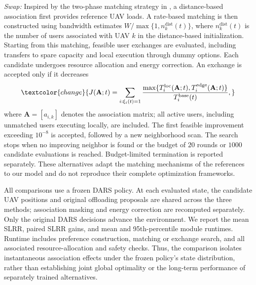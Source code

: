 \textcolor{change}{
\emph{Swap:} Inspired by the two-phase matching strategy in
\cite{wang2025matching}, a distance-based association first provides
reference UAV loads. A rate-based matching is then constructed using
bandwidth estimates $W/\max\{1,n_k^{\mathrm{dist}}(t)\}$, where
$n_k^{\mathrm{dist}}(t)$ is the number of users associated with UAV $k$
in the distance-based initialization. Starting from this matching,
feasible user exchanges are evaluated, including transfers to spare
capacity and local execution through dummy options. Each candidate
undergoes resource allocation and energy correction. An exchange is
accepted only if it decreases
}
\begin{equation}
\textcolor{change}{
 J(\mathbf A;t)=\sum_{i:\xi_i(t)=1}
 \frac{\max\{T_i^{\mathrm{loc}}(\mathbf A;t),
             T_i^{\mathrm{edge}}(\mathbf A;t)\}}
      {T_i^{\mathrm{base}}(t)},
}
\label{eq:association_evaluation}
\end{equation}
\textcolor{change}{
where $\mathbf A=[a_{i,k}]$ denotes the association matrix; all active
users, including unmatched users executing locally, are included.
The first feasible improvement exceeding $10^{-8}$ is accepted,
followed by a new neighborhood scan. The search stops when no
improving neighbor is found or the budget of $20$ rounds or $1000$
candidate evaluations is reached. Budget-limited termination is
reported separately. These alternatives adapt the matching mechanisms
of the references to our model and do not reproduce their complete
optimization frameworks.
}

\textcolor{change}{
All comparisons use a frozen DARS policy. At each evaluated state,
the candidate UAV positions and original offloading proposals are
shared across the three methods; association masking and energy
correction are recomputed separately. Only the original DARS decisions
advance the environment. We report the mean SLRR, paired SLRR gains,
and mean and 95th-percentile module runtimes. Runtime includes
preference construction, matching or exchange search, and all
associated resource-allocation and safety checks. Thus, the comparison
isolates instantaneous association effects under the frozen policy's
state distribution, rather than establishing joint global optimality
or the long-term performance of separately trained alternatives.
}
